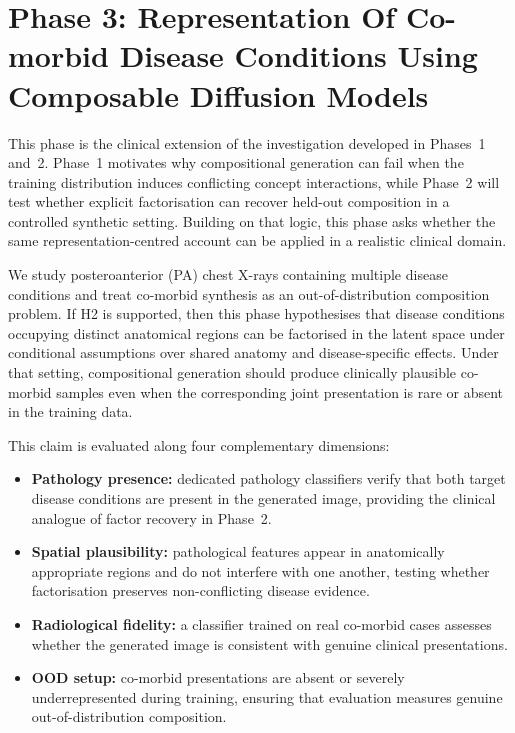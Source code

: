
\section{Phase 3: Representation Of Co-morbid Disease Conditions Using Composable Diffusion Models}
\label{sec:phase_3}
This phase is the clinical extension of the investigation developed in Phases~1 and~2.
Phase~1 motivates why compositional generation can fail when the training distribution induces conflicting concept interactions, while Phase~2 will test whether explicit factorisation can recover held-out composition in a controlled synthetic setting.
Building on that logic, this phase asks whether the same representation-centred account can be applied in a realistic clinical domain.

We study posteroanterior (PA) chest X-rays containing multiple disease conditions and treat co-morbid synthesis as an out-of-distribution composition problem.
If H2 is supported, then this phase hypothesises that disease conditions occupying distinct anatomical regions can be factorised in the latent space under conditional assumptions over shared anatomy and disease-specific effects.
Under that setting, compositional generation should produce clinically plausible co-morbid samples even when the corresponding joint presentation is rare or absent in the training data.

This claim is evaluated along four complementary dimensions:
\begin{itemize}
    \item \textbf{Pathology presence:} dedicated pathology classifiers verify that both target disease conditions are present in the generated image, providing the clinical analogue of factor recovery in Phase~2.

    \item \textbf{Spatial plausibility:} pathological features appear in anatomically appropriate regions and do not interfere with one another, testing whether factorisation preserves non-conflicting disease evidence.

    \item \textbf{Radiological fidelity:} a classifier trained on real co-morbid cases assesses whether the generated image is consistent with genuine clinical presentations.

    \item \textbf{OOD setup:} co-morbid presentations are absent or severely underrepresented during training, ensuring that evaluation measures genuine out-of-distribution composition.
\end{itemize}

